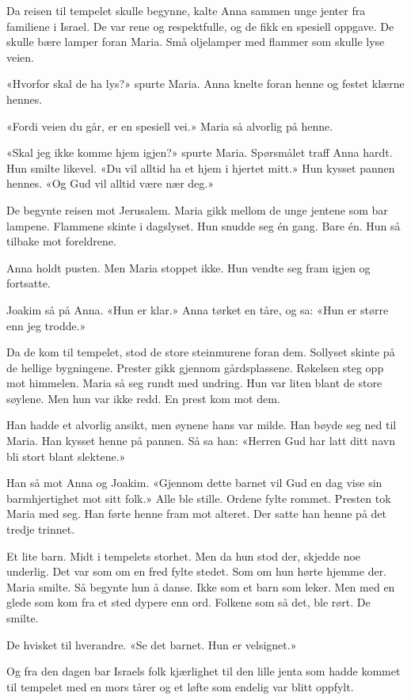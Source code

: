 Da reisen til tempelet skulle begynne,
kalte Anna sammen unge jenter fra familiene i Israel.
De var rene og respektfulle, og de fikk en spesiell oppgave.
De skulle bære lamper foran Maria.
Små oljelamper med flammer som skulle lyse veien.

«Hvorfor skal de ha lys?» spurte Maria.
Anna knelte foran henne og festet klærne hennes.

«Fordi veien du går, er en spesiell vei.»
Maria så alvorlig på henne.

«Skal jeg ikke komme hjem igjen?» spurte Maria.
Spørsmålet traff Anna hardt.
Hun smilte likevel.
«Du vil alltid ha et hjem i hjertet mitt.»
Hun kysset pannen hennes.
«Og Gud vil alltid være nær deg.»

De begynte reisen mot Jerusalem.
Maria gikk mellom de unge jentene som bar lampene.
Flammene skinte i dagslyset.
Hun snudde seg én gang.
Bare én.
Hun så tilbake mot foreldrene.

Anna holdt pusten.
Men Maria stoppet ikke.
Hun vendte seg fram igjen og fortsatte.

Joakim så på Anna. «Hun er klar.»
Anna tørket en tåre, og sa: «Hun er større enn jeg trodde.»

Da de kom til tempelet, stod de store steinmurene foran dem.
Sollyset skinte på de hellige bygningene.
Prester gikk gjennom gårdsplassene.
Røkelsen steg opp mot himmelen.
Maria så seg rundt med undring.
Hun var liten blant de store søylene.
Men hun var ikke redd.
En prest kom mot dem.

Han hadde et alvorlig ansikt, men øynene hans var milde.
Han bøyde seg ned til Maria.
Han kysset henne på pannen. Så sa han:
«Herren Gud har latt ditt navn bli stort blant slektene.»

Han så mot Anna og Joakim.
«Gjennom dette barnet vil Gud en dag vise sin barmhjertighet mot sitt folk.»
Alle ble stille.
Ordene fylte rommet.
Presten tok Maria med seg.
Han førte henne fram mot alteret.
Der satte han henne på det tredje trinnet.

Et lite barn.
Midt i tempelets storhet.
Men da hun stod der, skjedde noe underlig.
Det var som om en fred fylte stedet.
Som om hun hørte hjemme der.
Maria smilte.
Så begynte hun å danse.
Ikke som et barn som leker.
Men med en glede som kom fra et sted dypere enn ord.
Folkene som så det, ble rørt.
De smilte.

De hvisket til hverandre.
«Se det barnet. Hun er velsignet.»

Og fra den dagen bar Israels folk kjærlighet til
den lille jenta som hadde kommet til tempelet
med en mors tårer og et løfte som endelig var blitt oppfylt.


